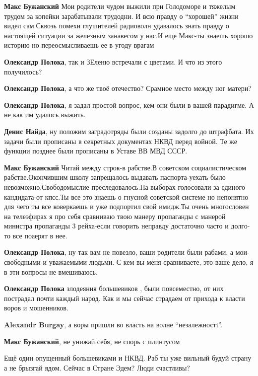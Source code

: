 \begin{itemize}
\begin{itemize}
\begin{itemize}
\textbf{Макс Бужанский} Мои родители чудом выжили при Голодоморе и тяжелым
трудом за копейки зарабатывали трудодни. И всю правду о \enquote{хорошей} жизни видел
сам.Сквозь помехи глушителей радиоволн удавалось знать правду о настоящей
ситуации за железным занавесом у нас.И еще Макс-ты знаешь хорошо историю но
переосмысливаешь ее в угоду врагам

\textbf{Олександр Полока}, так и ЗЕленю встречали с цветами. И что из этого получилось?

\textbf{Олександр Полока}, а что же твоё отечество? Срамное место между ног матери?

\textbf{Олександр Полока}, я задал простой вопрос, кем они были в вашей парадигме.
А не как им удалось выжить.

\textbf{Денис Найда}, ну положим заградотряды были созданы задолго до
штрафбата. Их задачи были прописаны в секретных документах НКВД перед войной.
Те же функции позднее были прописаны в Уставе ВВ МВД СССР.

\textbf{Макс Бужанский} Читай между строк-в рабстве.В советском
социалистическом рабстве.Окончившим школу запрещалось выдавать паспорта-уехать
было невозможно.Свободомыслие преследовалось.На выборах голосовали за единого
кандидата-от кпсс.Ты все это знаешь о гнусной советской системе но непонятно
для чего ты все коверкаешь и уже подпортил свой имидж.Ты очень многословен на
телеэфирах я про себя сравниваю твою манеру пропаганды с манерой министра
пропаганды 3 рейха-если говорить неправду достаточно часто и долго-то все
поаерят в нее.

\textbf{Олександр Полока}, ну так вам не повезло, ваши родители были рабами, а
мои- свободными и уважаемыми людьми.  С кем вы меня сравниваете, это ваше дело,
я в эти вопросы не вмешиваюсь.

\textbf{Олександр Полока} злодеяния большевиков , были повсеместно, от них пострадал почти каждый народ. Как и мы сейчас страдаем от прихода к власти воров и мошенников.

\textbf{Alexandr Burgay}, а воры пришли во власть на волне \enquote{незалежностi}.

\textbf{Макс Бужанский}, не унижай себя, не спорь с плинтусом

Ещё один опущенный большевиками и НКВД. Раб ты уже вильный будуй страну а не
брызгай ядом. Сейчас в Стране Эдем? Люди счастливы?


\end{itemize}
\end{itemize}
\end{itemize}
